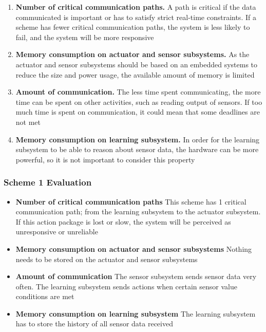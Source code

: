 \begin{enumerate}
\item \textbf{Number of critical communication paths.} A path is critical if the data communicated is important or has to satisfy strict real-time constraints. If a scheme has fewer critical communication paths, the system is less likely to fail, and the system will be more responsive
\item \textbf{Memory consumption on actuator and sensor subsystems.} As the actuator and sensor subsystems should be based on an embedded systems to reduce the size and power usage, the available amount of memory is limited
\item \textbf{Amount of communication.} The less time spent communicating, the more time can be spent on other activities, such as reading output of sensors. If too much time is spent on communication, it could mean that some deadlines are not met
\item \textbf{Memory consumption on learning subsystem.} In order for the learning subsystem to be able to reason about sensor data, the hardware can be more powerful, so it is not important to consider this property
\end{enumerate}

\subsubsection{Scheme 1 Evaluation}
\begin{itemize}
\item \textbf{Number of critical communication paths} This scheme has 1 critical communication path; from the learning subsystem to the actuator subsystem. If this action package is lost or slow, the system will be perceived as unresponsive or unreliable
\item \textbf{Memory consumption on actuator and sensor subsystems} Nothing needs to be stored on the actuator and sensor subsystems
\item \textbf{Amount of communication} The sensor subsystem sends sensor data very often. The learning subsystem sends actions when certain sensor value conditions are met
\item \textbf{Memory consumption on learning subsystem} The learning subsystem has to store the history of all sensor data received
\end{itemize}

